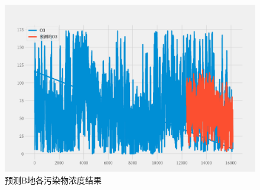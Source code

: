 \documentclass[a4paper,10pt]{my_paper}
\numberwithin{equation}{section}
\begin{document}
\begin{figure}[htbp]
\begin{minipage}[c]{0.3\textwidth}
		\end{minipage}
    \begin{minipage}[c]{0.3\textwidth}
			\centering
			\includegraphics[width=1\textwidth]{prob3/预测B地_O3.pdf} 
		\end{minipage}
\caption{预测B地各污染物浓度结果}\label{fig_Q3B地预测图}
\end{figure}
\end{document}
